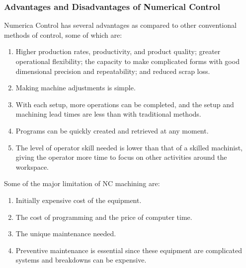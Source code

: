 \subsubsection{Advantages and Disadvantages of Numerical Control}
Numerica Control has several advantages as compared to other conventional methods of control\cite{Kalpakjian2010}, some of which are:
\begin{enumerate}
	\item Higher production rates, productivity, and product quality; greater operational flexibility; the capacity to make complicated forms with good dimensional precision and repeatability; and reduced scrap loss.
	\item Making machine adjustments is simple.
	\item With each setup, more operations can be completed, and the setup and machining lead times are less than with traditional methods.
	\item Programs can be quickly created and retrieved at any moment.
	\item The level of operator skill needed is lower than that of a skilled machinist, giving the operator more time to focus on other activities around the workspace.
\end{enumerate}
Some of the major limitation of NC machining are:
\begin{enumerate}
	\item Initially expensive cost of the equipment.
	\item The cost of programming and the price of computer time.
	\item The unique maintenance needed.
	\item Preventive maintenance is essential since these equipment are complicated systems and breakdowns can be expensive.
\end{enumerate}